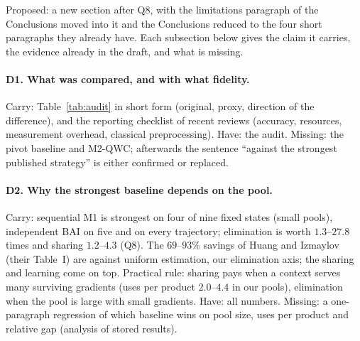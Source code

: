 \documentclass[11pt]{article}
\begin{document}
Proposed: a new section after Q8, with the limitations paragraph of the Conclusions moved into it and the Conclusions reduced to the four short paragraphs they already have. Each subsection below gives the claim it carries, the evidence already in the draft, and what is missing.

\paragraph{D1. What was compared, and with what fidelity.} Carry: Table~\ref{tab:audit} in short form (original, proxy, direction of the difference), and the reporting checklist of recent reviews (accuracy, resources, measurement overhead, classical preprocessing). Have: the audit. Missing: the pivot baseline and M2-QWC; afterwards the sentence ``against the strongest published strategy'' is either confirmed or replaced.

\paragraph{D2. Why the strongest baseline depends on the pool.} Carry: sequential M1 is strongest on four of nine fixed states (small pools), independent BAI on five and on every trajectory; elimination is worth $1.3$--$27.8$ times and sharing $1.2$--$4.3$ (Q8). The $69$--$93\%$ savings of Huang and Izmaylov (their Table~I) are against uniform estimation, our elimination axis; the sharing and learning come on top. Practical rule: sharing pays when a context serves many surviving gradients (uses per product $2.0$--$4.4$ in our pools), elimination when the pool is large with small gradients. Have: all numbers. Missing: a one-paragraph regression of which baseline wins on pool size, uses per product and relative gap (analysis of stored results).
\end{document}
